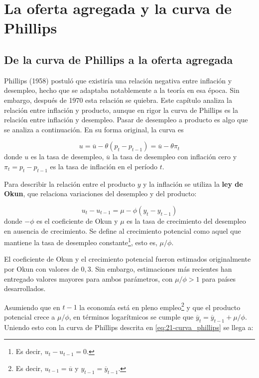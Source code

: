 \documentclass[DeGregorioResumen]{subfiles}
\begin{document}
\setcounter{section}{20}
\section{La oferta agregada y la curva de Phillips}

\subsection{De la curva de Phillips a la oferta agregada}

Phillips (1958) postuló que existiría una relación negativa entre inflación y desempleo, hecho que se adaptaba notablemente a la teoría en esa época. Sin embargo, después de 1970 esta relación se quiebra. Este capítulo analiza la relación entre inflación y producto, aunque en rigor la curva de Phillips es la relación entre inflación y desempleo. Pasar de desempleo a producto es algo que se analiza a continuación. En su forma original, la curva es

\begin{equation}
	u = \overline u - \theta(p_t-p_{t-1}) = \overline u - \theta \pi_t
	\label{eq:21-curva_phillips}
\end{equation}
donde $u$ es la tasa de desempleo, $\overline u$ la tasa de desempleo con inflación cero y $\pi_t=p_t-p_{t-1}$ es la tasa de inflación en el período $t$.

Para describir la relación entre el producto $y$ y la inflación se utiliza la \textbf{ley de Okun}, que relaciona variaciones del desempleo y del producto:

\begin{equation}
	u_t - u_{t-1} = \mu - \phi (y_t - y_{t-1})
\end{equation}
donde $-\phi$ es el coeficiente de Okun y $\mu$ es la tasa de crecimiento del desempleo en ausencia de crecimiento. Se define al crecimiento potencial como aquel que mantiene la tasa de desempleo constante\footnote{Es decir, $u_t-u_{t-1}=0$.}, esto es, $\mu/\phi$.

El coeficiente de Okun y el crecimiento potencial fueron estimados originalmente por Okun con valores de $0,3$. Sin embargo, estimaciones más recientes han entregado valores mayores para ambos parámetros, con $\mu/\phi > 1$ para países desarrollados.

Asumiendo que en $t-1$ la economía está en pleno empleo\footnote{Es decir, $u_{t-1}=\overline u$ y $y_{t-1}=\overline y_{t-1}$.} y que el producto potencial crece a $\mu/\phi$, en términos logarítmicos se cumple que $\overline y_t = \overline y_{t-1} + \mu/\phi$. Uniendo esto con la curva de Phillips descrita en \eqref{eq:21-curva_phillips} se llega a:
\end{document}
